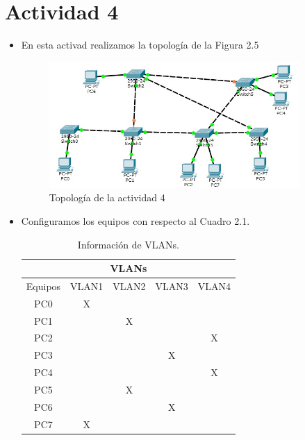 \documentclass[spanish]{udpreport}
\begin{document}
\section{Actividad 4}
\begin{itemize}
\item En esta activad realizamos la topología de la Figura 2.5
\begin{figure}[h!]
	\centering
	\includegraphics[width=0.90\textwidth]{./imagenes/redes6}
	\caption{Topología de la actividad 4} 
\end{figure}
\vspace{2 cm}
\item Configuramos los equipos con respecto al Cuadro 2.1.

\begin{table}[htbp]
\begin{center}
\begin{tabular}{| c| |c| |c| |c| |c|}
\hline
\multicolumn{5}{|c|}{VLANs} \\ \hline
Equipos & VLAN1 & VLAN2 & VLAN3 & VLAN4\\
\hline \hline
PC0 & X &   &   &  \\ \hline
PC1 &  & X  &   &  \\ \hline
PC2 &  &  &   & X \\ \hline
PC3 &  &  & X & \\ \hline
PC4 &  &  &  & X \\ \hline
PC5 &  &X  &  & \\ \hline
PC6 &  &  & X  & \\ \hline
PC7 & X & &  &  \\ \hline
\end{tabular}
\caption{Información de VLANs.}
\label{tabla:sencilla}
\end{center}
\end{table}


\end{itemize}
\end{document}
